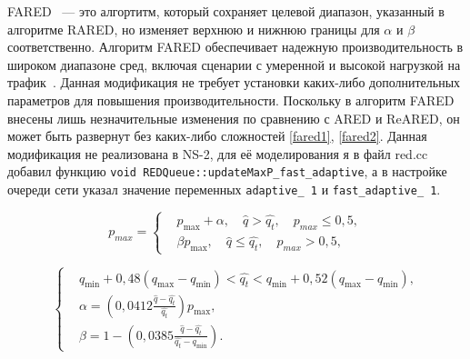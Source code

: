 FARED ~--- это алгортитм, который сохраняет целевой диапазон, указанный в алгоритме RARED, но изменяет верхнюю и нижнюю границы для $\alpha $ и $\beta$ соответственно. Алгоритм FARED обеспечивает надежную производительность в широком диапазоне сред, включая сценарии с умеренной и высокой нагрузкой на трафик~\cite{Tahiliani_2012}.
Данная модификация не требует установки каких-либо дополнительных параметров для повышения производительности. Поскольку в алгоритм FARED внесены лишь незначительные изменения по сравнению
с ARED и ReARED, он может быть развернут без каких-либо сложностей \eqref{fared1}, \eqref{fared2}. Данная модификация не реализована в NS-2, для её моделирования я в файл red.cc добавил функцию \verb|void REDQueue::updateMaxP_fast_adaptive|, а в настройке очереди сети указал значение переменных \verb|adaptive_ 1| 
и \verb|fast_adaptive_ 1|. 

\begin{equation}
\label{fared1}
p_{max} = \left\{
  \begin{aligned}
& p_{\max}+\alpha, \quad  \hat{q}>\hat{q_{t}}, \quad p_{max} \leqslant 0,5, \\
& \beta p_{\max}, \quad \hat{q}\leqslant\hat{q_{t}}, \quad p_{max} > 0,5,
  \end{aligned}
\right.
\end{equation}

\begin{equation}
\label{fared2}
\left\{
  \begin{aligned}
    & q_{\min}+0,48\left(q_{\max}-q_{\min}\right) < \hat{q_t} < q_{\min}+0,52\left(q_{\max}-q_{\min}\right), \\
    & \alpha=\left(0,0412\frac{\hat{q}-\hat{q_t}}{\hat{q_t}} \right)p_{\max}, \\ 
    & \beta=1-\left(0,0385\frac{\hat{q}-\hat{q_t}}{\hat{q_t}-q_{\min}}\right).
  \end{aligned}
\right.
\end{equation}


